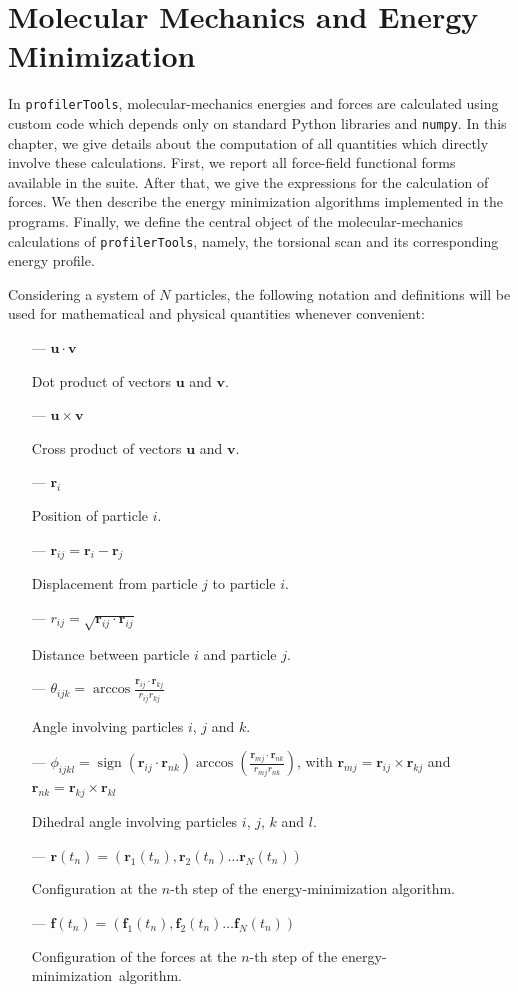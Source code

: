 \documentclass[10pt,a4paper,openany]{memoir}
\numberwithin{equation}{section}
\DeclareMathOperator{\sign}{sign}
\newcommand{\rsub}[1]{\mathbf{r}_{#1}}
\newcommand{\fsub}[1]{\mathbf{f}_{#1}}
\newcommand{\profilertools}[0]{\texttt{profilerTools}}
\begin{document}
\chapter{Molecular Mechanics and Energy Minimization}
\label{chap:mm}

In \profilertools{}, molecular-mechanics energies and forces are calculated using custom code which depends only on standard Python libraries and \texttt{numpy}.
In this chapter, we give details about the computation of all quantities which directly involve these calculations.
First, we report all force-field functional forms available in the suite.
After that, we give the expressions for the calculation of forces.
We then describe the energy minimization algorithms implemented in the programs.
Finally, we define the central object of the molecular-mechanics calculations of \profilertools{}, namely, the torsional scan and its corresponding energy profile.

Considering a system of $N$ particles, the following notation and definitions will be used for mathematical and physical quantities whenever convenient:

\begin{itemize}
\item[---] $\mathbf{u} \cdot \mathbf{v}$ \par  Dot product of vectors $\mathbf{u}$ and $\mathbf{v}$.
\item[---] $\mathbf{u} \times \mathbf{v}$ \par  Cross product of vectors $\mathbf{u}$ and $\mathbf{v}$.
\item[---] $\mathbf{r}_i$ \par  Position of particle $i$.
\item[---] $\mathbf{r}_{ij} = \mathbf{r}_i - \mathbf{r}_j$ \par  Displacement from particle $j$ to particle $i$.
\item[---] $r_{ij} = \sqrt{\mathbf{r}_{ij} \cdot \mathbf{r}_{ij}}$ \par  Distance between particle $i$ and particle $j$.
\item[---] $\theta_{ijk} = \arccos{\frac{\mathbf{r}_{ij} \cdot \mathbf{r}_{kj}}{r_{ij}r_{kj}}}$  \par  Angle involving particles $i$, $j$ and $k$.
\item[---] $\phi_{ijkl} = \sign{(\rsub{ij} \cdot \rsub{nk})} \arccos{\left( \frac{\rsub{mj} \cdot \rsub{nk}}{r_{mj}r_{nk}} \right)}$, with $\rsub{mj} = \rsub{ij}\times\rsub{kj}$ and $\rsub{nk} = \rsub{kj}\times\rsub{kl}$
  \par  Dihedral angle involving particles $i$, $j$, $k$ and $l$.
\item[---] $\mathbf{r}(t_n) = (\rsub{1}(t_n),\rsub{2}(t_n)\ldots\rsub{N}(t_n))$
  \par
  
  Configuration at the $n$-th step of the energy-minimization algorithm.
\item[---] $\mathbf{f}(t_n) = (\fsub{1}(t_n),\fsub{2}(t_n)\ldots\fsub{N}(t_n))$
  \par
  Configuration of the forces at the $n$-th step of the energy-minimization~algorithm.
\end{itemize}
\end{document}
